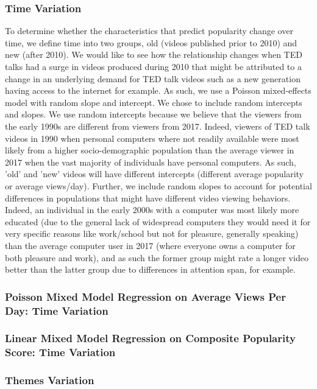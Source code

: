 \subsubsection{Time Variation}
To determine whether the characteristics that predict popularity change over time, we define time into two groups, old (videos published prior to 2010) and new (after 2010). 
We would like to see how the relationship changes when TED talks had a surge in videos produced during 2010 that might be attributed to a change in an underlying demand for TED talk videos such as a new generation having access to the internet for example. 
As such, we use a Poisson mixed-effects model with random slope and intercept.
We chose to include random intercepts and slopes. 
We use random intercepts because we believe that the viewers from the early 1990s are different from viewers from 2017. Indeed, viewers of TED talk videos in 1990 when personal computers where not readily available were most likely from a higher socio-demographic population than the average viewer in 2017 when the vast majority of individuals have personal computers. As such, 'old' and 'new' videos will have different intercepts (different average popularity or average views/day).
Further, we include random slopes to account for potential differences in populations that might have different video viewing behaviors. Indeed, an individual in the early 2000s with a computer was most likely more educated (due to the general lack of widespread computers they would need it for very specific reasons like work/school but not for pleasure, generally speaking) than the average computer user in 2017 (where everyone owns a computer for both pleasure and work), and as such the former group might rate a longer video better than the latter group due to differences in attention span, for example. 

\subsubsection{Poisson Mixed Model Regression on Average Views Per Day: Time Variation}
\subsubsection{Linear Mixed Model Regression on Composite Popularity Score: Time Variation}

\subsubsection{Themes Variation}


